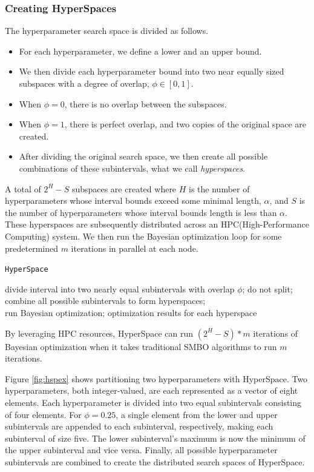 \subsubsection{Creating HyperSpaces}
The hyperparameter search space is divided as follows.
\begin{itemize}
	\item For each hyperparameter, we define a lower and an upper bound.
	\item We then divide each hyperparameter bound into two near equally sized subspaces with a degree of overlap, $ \phi \in [0,1] $.
	\item When $\phi=0$, there is no overlap between the subspaces.
	\item When $\phi=1$, there is perfect overlap, and two copies of the original space are created.
	\item After dividing the original search space, we then create all possible combinations of these subintervals, what we call \textit{hyperspaces}.
\end{itemize}
A total of $2^H-S$ subspaces are created where $H$ is the number of hyperparameters whose interval bounds exceed some minimal length, $\alpha$, and $S$ is the number of hyperparameters whose interval bounds length is less than $\alpha$.
These hyperspaces are subsequently distributed across an HPC(High-Performance Computing) system.
We then run the Bayesian optimization loop for some predetermined $m$ iterations in parallel at each node.\\

\begin{algorithm}[H] 
	\caption{\texttt{HyperSpace}}
	{
		{
			divide interval into two nearly equal subintervals with overlap $\phi$;
		}
		{
			do not split;
		}
	}
	combine all possible subintervals to form hyperspaces;\\
	{
		run Bayesian optimization;
	}
	\Return optimization results for each hyperspace
\end{algorithm}
\vspace{2em}
By leveraging HPC resources, HyperSpace can run $(2^H-S) * m$ iterations of Bayesian optimization when it takes traditional SMBO algorithms to run $m$ iterations.

Figure \ref{fig:hspex} shows partitioning two hyperparameters with HyperSpace. Two hyperparameters, both integer-valued, are each represented as a vector of eight elements. 
Each hyperparameter is divided into two equal subintervals consisting of four elements. 
For $\phi = 0.25$, a single element from the lower and upper subintervals are appended to each subinterval, respectively, making each subinterval of size five. The lower subinterval's maximum is now the minimum of the upper subinterval and vice versa. 
Finally, all possible hyperparameter subintervals are combined to create the distributed search spaces of HyperSpace.


